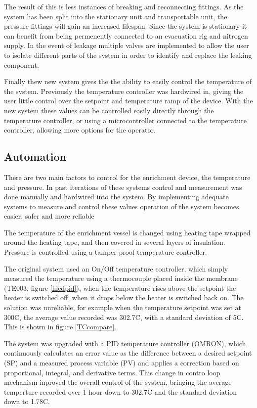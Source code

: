 The result of this is less instances of breaking and reconnecting fittings. As the system has been split into the stationary unit and transportable unit, the pressure fittings will gain an increased lifespan. Since the system is stationary it can benefit from being permenently connected to an evacuation rig and nitrogen supply. In the event of leakage multiple valves are implemented to allow the user to isolate different parts of the system in order to identify and replace the leaking component.

Finally thew new system gives the the ability to easily control the temperature of the system. Previously the temperature controller was hardwired in, giving the user little control over the setpoint and temperature ramp of the device. With the new system these values can be controlled easily directly through the temperature controller, or using a microcontroller connected to the temperature controller, allowing more options for the operator.

\subsection{Automation}\label{dataproc}
There are two main factors to control for the enrichment device, the temperature and pressure. In past iterations of these systems control and measurement was done manually and hardwired into the system. By implementing adequate systems to measure and control these values operation of the system becomes easier, safer and more reliable 

The temperature of the enrichment vessel is changed using heating tape wrapped around the heating tape, and then covered in several layers of insulation. Pressure is controlled using a tamper proof temperature controller.

The original system used an On/Off temperature controller, which simply measured the temperature using a thermocouple placed inside the membrane (TE003, figure \ref{hiedpid}), when the temperature rises above the setpoint the heater is switched off, when it drops below the heater is switched back on. The solution was unreliable, for example when the temperature setpoint was set at 300\textdegree C, the average value recorded was 302.7\textdegree C, with a standard deviation of 5\textdegree C. This is shown in figure \ref{TCcompare}. 

The system was upgraded with a PID temperature controller (OMRON), which continuously calculates an error value as the difference between a desired setpoint (SP) and a measured process variable (PV) and applies a correction based on proportional, integral, and derivative terms. This change in contro loop mechanism inproved the overall control of the system, bringing the average temperture recorded over 1 hour down to 302.7\textdegree C and the standard deviation down to 1.78\textdegree C.

